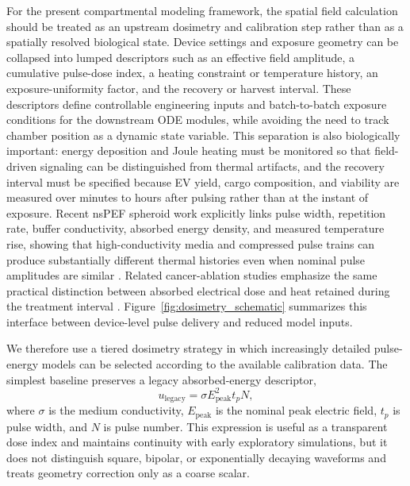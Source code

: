 For the present compartmental modeling framework, the spatial field calculation should be treated as an upstream dosimetry and calibration step rather than as a spatially resolved biological state. Device settings and exposure geometry can be collapsed into lumped descriptors such as an effective field amplitude, a cumulative pulse-dose index, a heating constraint or temperature history, an exposure-uniformity factor, and the recovery or harvest interval. These descriptors define controllable engineering inputs and batch-to-batch exposure conditions for the downstream ODE modules, while avoiding the need to track chamber position as a dynamic state variable. This separation is also biologically important: energy deposition and Joule heating must be monitored so that field-driven signaling can be distinguished from thermal artifacts, and the recovery interval must be specified because EV yield, cargo composition, and viability are measured over minutes to hours after pulsing rather than at the instant of exposure. Recent nsPEF spheroid work explicitly links pulse width, repetition rate, buffer conductivity, absorbed energy density, and measured temperature rise, showing that high-conductivity media and compressed pulse trains can produce substantially different thermal histories even when nominal pulse amplitudes are similar \cite{orlacchio2023effects}. Related cancer-ablation studies emphasize the same practical distinction between absorbed electrical dose and heat retained during the treatment interval \cite{gudvangen2022electroporation}. Figure~\ref{fig:dosimetry_schematic} summarizes this interface between device-level pulse delivery and reduced model inputs.

We therefore use a tiered dosimetry strategy in which increasingly detailed pulse-energy models can be selected according to the available calibration data. The simplest baseline preserves a legacy absorbed-energy descriptor,
\begin{equation}
u_{\mathrm{legacy}}=\sigma E_{\mathrm{peak}}^{2}t_pN ,
\end{equation}
where $\sigma$ is the medium conductivity, $E_{\mathrm{peak}}$ is the nominal peak electric field, $t_p$ is pulse width, and $N$ is pulse number. This expression is useful as a transparent dose index and maintains continuity with early exploratory simulations, but it does not distinguish square, bipolar, or exponentially decaying waveforms and treats geometry correction only as a coarse scalar.

